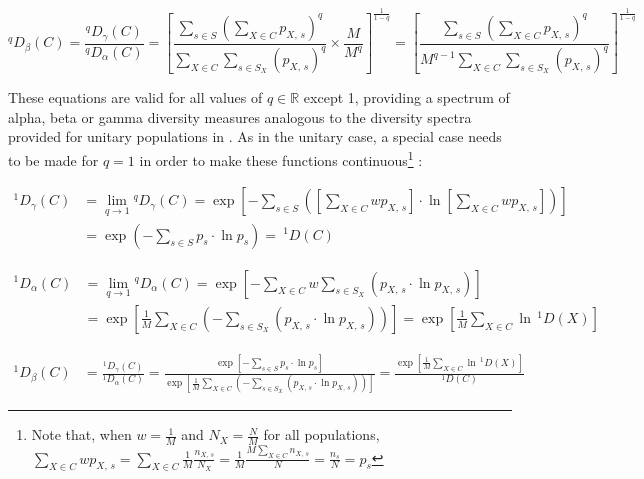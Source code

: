 \begin{equation}
^qD_\beta(C) = \frac{^qD_\gamma(C)}{^qD_\alpha(C)}
= \left[
\frac{\displaystyle\sum_{s \in S}\left(\sum_{X \in C} p_{X,\,s}\right)^q}{\displaystyle \sum_{X \in C}\sum_{s \in S_X} (p_{X,\,s})^q}
\times
\frac{\displaystyle M}{\displaystyle M^q}
\right]^\frac{1}{1-q}
= \left[
\frac{\displaystyle\sum_{s \in S}\left(\sum_{X \in C} p_{X,\,s}\right)^q}{\displaystyle M^{q-1} \sum_{X \in C}\sum_{s \in S_X} (p_{X,\,s})^q}
\right]^\frac{1}{1-q}
\label{eq:diversity_beta_even}
\end{equation}

\noindent These equations are valid for all values of $q \in \mathbb{R}$ except 1, providing a spectrum of alpha, beta or gamma diversity measures analogous to the diversity spectra provided for unitary populations in . As in the unitary case, a special case needs to be made for $q = 1$ in order to make these functions continuous\footnote{Note that, when $w = \frac{1}{M}$ and $N_X = \frac{N}{M}$ for all populations, $\displaystyle\sum_{X \in C}wp_{X,\,s} = \sum_{X \in C}\frac{1}{M}\frac{n_{X,\,s}}{N_X} = \frac{1}{M}\frac{M \sum_{X \in C} n_{X,\,s}}{N} = \frac{n_{s}}{N} = p_s$} \parencite{jost2007partitioning}:

\begin{equation}
\begin{split}
^1D_\gamma(C) & = \lim_{q \to 1} {^qD}_\gamma(C)
= \exp\left[-\sum_{s \in S}\left(\left[\sum_{X \in C}wp_{X,\,s}\right]\cdot\ln \left[\sum_{X \in C}wp_{X,\,s}\right]\right)\right]\\
& = \exp\left(-\sum_{s \in S}p_s \cdot\ln p_s\right) =\:^1D(C)
\end{split}
\label{eq:diversity_gamma_q1}
\end{equation}

\begin{equation}
\begin{split}
^1D_\alpha(C) & = \lim_{q \to 1} {^qD}_\alpha(C)
= \exp\left[-\sum_{X \in C}w\sum_{s \in S_X}(p_{X,\,s}\cdot\ln p_{X,\,s})\right]\\
 & = \exp\left[\frac{1}{M}\sum_{X \in C}\left(-\sum_{s \in S_X}(p_{X,\,s}\cdot\ln p_{X,\,s})\right)\right] = \exp\left[\frac{1}{M}\sum_{X \in C}\ln\,^1D(X)\right]
\end{split}
\label{eq:diversity_alpha_q1}
\end{equation}

\begin{equation}
\begin{split}
^1D_\beta(C) & = \frac{^1D_\gamma(C)}{^1D_\alpha(C)} = \frac{\exp\left[-\sum_{s \in S}p_s \cdot\ln p_s\right]}{\exp\left[\frac{1}{M}\sum_{X \in C}\left(-\sum_{s \in S_X}(p_{X,\,s}\cdot\ln p_{X,\,s})\right)\right]} = \frac{\exp\left[\frac{1}{M}\sum_{X \in C}\ln\,^1D(X)\right]}{^1D(C)}
\end{split}
\label{eq:diversity_beta_q1}
\end{equation}


